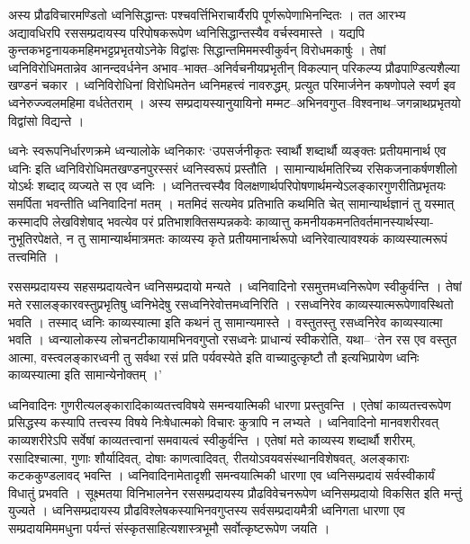 \documentclass[10pt, a5paper, twoside]{article}
\begin{document}
अस्य प्रौढविचारमण्डितो ध्वनिसिद्धान्तः पश्चवर्त्तिभिराचार्यैरपि पूर्णरूपेणाभिनन्दितः । तत  आरभ्य अद्यावधिरपि रससम्प्रदायस्य परिपोषकरूपेण ध्वनिसिद्धान्तस्यैव वर्चस्वमास्ते । यद्यपि कुन्तकभट्टनायकमहिमभट्टप्रभृतयोऽनेके विद्वांसः सिद्धान्तमिममस्वीकुर्वन् विरोधमकार्षुः । तेषां ध्वनिविरोधिमतान्नेव आनन्दवर्धनेन अभाव–भाक्त–अनिर्वचनीयप्रभृतीन् विकल्पान् परिकल्प्य प्रौढपाण्डित्यशैल्या खण्डनं चकार । ध्वनिविरोधिनां विरोधिमतेन ध्वनिमहत्त्वं नावरुद्धम्, प्रत्युत परिमार्जनेन कषणोपले स्वर्ण इव ध्वनेरुज्ज्वलमहिमा वर्धतेतराम् । अस्य सम्प्रदायस्यानुयायिनो मम्मट–अभिनवगुप्त–विश्वनाथ–जगन्नाथप्रभृतयो विद्वांसो विद्यन्ते ।

ध्वनेः स्वरूपनिर्धारणक्रमे ध्वन्यालोके ध्वनिकारः ‘उपसर्जनीकृतः स्वार्थौ शब्दार्थौ व्यङ्क्तः प्रतीयमानार्थ एव ध्वनिः इति ध्वनिविरोधिमतखण्डनपुरस्सरं ध्वनिस्वरूपं प्रस्तौति । सामान्यार्थमतिरिच्य रसिकजनाकर्षणशीलो योऽर्थः शब्दाद् व्यज्यते स एव ध्वनिः । ध्वनितत्त्वस्यैव विलक्षणार्थपरिपोषणार्थमन्येऽलङ्कारगुणरीतिप्रभृतयः समर्पिता भवन्तीति ध्वनिवादिनां मतम् । मतमिदं सत्यमेव प्रतिभाति कथमिति चेत् सामान्यार्थज्ञानं तु यस्मात् कस्मादपि लेखविशेषाद् भवत्येव परं प्रतिभाशक्तिसम्पन्नकवेः काव्यात्तु कमनीयकमनतिवर्तमानस्यार्थस्या- नुभूतिरपेक्षते, न तु सामान्यार्थमात्रमतः काव्यस्य कृते प्रतीयमानार्थरूपो ध्वनिरेवात्यावश्यकं काव्यस्यात्मरूपं तत्त्वमिति ।

रससम्प्रदायस्य सहसम्प्रदायत्वेन ध्वनिसम्प्रदायो मन्यते । ध्वनिवादिनो रसमुत्तमध्वनिरूपेण स्वीकुर्वन्ति । तेषां मते रसालङ्कारवस्तुप्रभृतिषु ध्वनिभेदेषु रसध्वनिरेवोत्तमध्वनिरिति । रसध्वनिरेव  काव्यस्यात्मरूपेणावस्थितो भवति । तस्माद् ध्वनिः काव्यस्यात्मा इति कथनं तु सामान्यमास्ते । वस्तुतस्तु रसध्वनिरेव काव्यस्यात्मा भवति । ध्वन्यालोकस्य लोचनटीकायामभिनवगुप्तो रसध्वनेः प्राधान्यं स्वीकरोति, यथा– ‘तेन रस एव वस्तुत आत्मा, वस्त्वलङ्कारध्वनी तु सर्वथा रसं प्रति पर्यवस्येते इति वाच्यादुत्कृष्टौ तौ इत्यभिप्रायेण ध्वनिः काव्यस्यात्मा इति सामान्येनोक्तम् ।’

ध्वनिवादिनः गुणरीत्यलङ्कारादिकाव्यतत्त्वविषये समन्वयात्मिकी धारणा प्रस्तुवन्ति । एतेषां काव्यतत्त्वरूपेण प्रसिद्धस्य कस्यापि तत्त्वस्य विषये निःषेधात्मको विचारः कुत्रापि न लभ्यते । ध्वनिवादिनो मानवशरीरवत् काव्यशरीरेऽपि सर्वेषां काव्यतत्त्वानां समवायत्वं स्वीकुर्वन्ति । एतेषां मते काव्यस्य शब्दार्थौ शरीरम्, रसादिश्चात्मा, गुणाः शौर्यादिवत्, दोषाः काणत्वादिवत्, रीतयोऽवयवसंस्थानविशेषवत्, अलङ्काराः कटककुण्डलावद् भवन्ति । ध्वनिवादिनामेतादृशी समन्वयात्मिकी धारणा एव ध्वनिसम्प्रदायं सर्वस्वीकार्यं विधातुं प्रभवति । सूक्ष्मतया विनिभालनेन रससम्प्रदायस्य प्रौढविवेचनरूपेण ध्वनिसम्प्रदायो विकसित इति मन्तुं युज्यते । ध्वनिसम्प्रदायस्य प्रौढविश्लेषकस्याभिनवगुप्तस्य सर्वसम्प्रदायमैत्री ध्वनिगता धारणा एव सम्प्रदायमिममधुना पर्यन्तं संस्कृतसाहित्यशास्त्रभूमौ सर्वोत्कृष्टरूपेण जयति ।
\end{document}
